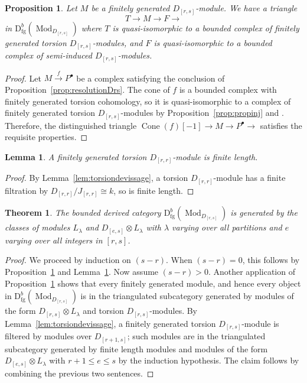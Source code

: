 \documentclass[12pt]{amsart}
\newcommand{\rD}{\mathrm{D}}
\DeclareMathOperator{\cone}{Cone}
\DeclareMathOperator{\Mod}{Mod}
\DeclareMathOperator{\fgen}{fg}
\newcommand{\Drs}{D_{[r,s]}}
\newcommand{\Jrr}{J_{[r,r]}}
\numberwithin{equation}{section}
\newtheorem{theorem}[equation]{Theorem}
\newtheorem{proposition}[equation]{Proposition}
\newtheorem{lemma}[equation]{Lemma}
\theoremstyle{definition}
\theoremstyle{plain}
\begin{document}
\begin{proposition}\label{prop:triangles}
    Let $M$ be a finitely generated $\Drs$-module. We have a triangle $$T \to M \to F \to$$ in $\rD^b_{\fgen}(\Mod_{\Drs})$ where $T$ is quasi-isomorphic to a bounded complex of finitely generated torsion $\Drs$-modules, and $F$ is quasi-isomorphic to a bounded complex of semi-induced $\Drs$-modules. 
\end{proposition}
\begin{proof}  Let $M \xrightarrow{f} P^{\bullet}$ be a complex satisfying the conclusion of Proposition~\ref{prop:resolutionDrs}. The cone of $f$ is a bounded complex with finitely generated torsion cohomology, so it is quasi-isomorphic to a complex of finitely generated torsion $\Drs$-modules by Proposition~\ref{prop:propinj} and \cite[Lemma~6.5]{gan25pol}. Therefore, the distinguished triangle $\cone(f)[-1] \to M \to P^{\bullet} \to$ satisfies the requisite properties. 
\end{proof}

\begin{lemma}\label{lem:torsionDrr}
    A finitely generated torsion $D_{[r,r]}$-module is finite length.
\end{lemma}
\begin{proof}
   By Lemma~\ref{lem:torsiondevissage}, a torsion $D_{[r,r]}$-module has a finite filtration by $D_{[r,r]}/\Jrr \cong k$, so is finite length.
\end{proof}


\begin{theorem}\label{thm:gensdbDrs}
The bounded derived category $\rD^b_{\fgen}(\Mod_{\Drs})$ is generated by the classes of modules $L_{\lambda}$ and $D_{[e,s]} \otimes L_{\lambda}$ with $\lambda$ varying over all partitions and $e$ varying over all integers in $[r, s]$.
\end{theorem}
\begin{proof}
We proceed by induction on $(s-r)$. When $(s - r) = 0$, this follows by Proposition~\ref{prop:triangles} and Lemma~\ref{lem:torsionDrr}. Now assume $(s - r) > 0$.  Another application of Proposition~\ref{prop:triangles} shows that every finitely generated module, and hence every object in $\rD^b_{\fgen}(\Mod_{\Drs})$ is in the triangulated subcategory generated by modules of the form $\Drs \otimes L_{\lambda}$ and torsion $\Drs$-modules. 
By Lemma~\ref{lem:torsiondevissage}, a finitely generated torsion $\Drs$-module is filtered by modules over $D_{[r+1, s]}$; such modules are in the triangulated subcategory generated by finite length modules and modules of the form $D_{[e, s]} \otimes L_{\lambda}$ with $r+1 \leq e \leq s$ by the induction hypothesis. The claim follows by combining the previous two sentences.
\end{proof}
\end{document}

